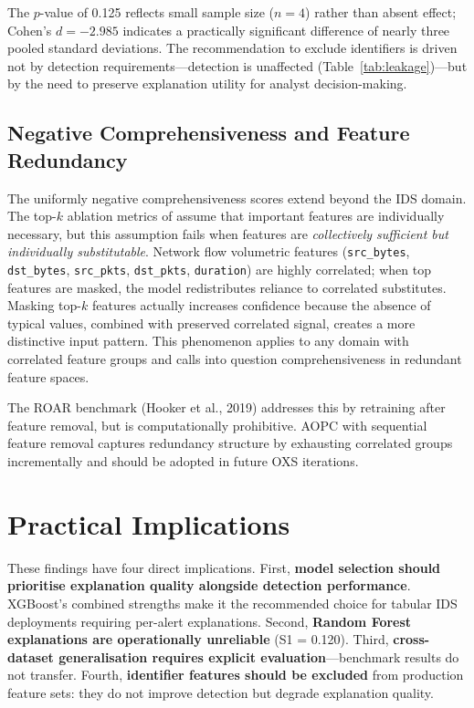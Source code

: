 \documentclass[12pt,a4paper]{report}
\begin{document}
The $p$-value of 0.125 reflects small sample size ($n = 4$) rather than absent effect; Cohen's $d = -2.985$ indicates a practically significant difference of nearly three pooled standard deviations. The recommendation to exclude identifiers is driven not by detection requirements---detection is unaffected (Table~\ref{tab:leakage})---but by the need to preserve explanation utility for analyst decision-making.

\subsection{Negative Comprehensiveness and Feature Redundancy}
\label{sec:neg-comp}

The uniformly negative comprehensiveness scores extend beyond the IDS domain. The top-$k$ ablation metrics of \cite{deyoung2020} assume that important features are individually necessary, but this assumption fails when features are \textit{collectively sufficient but individually substitutable}. Network flow volumetric features (\texttt{src\_bytes}, \texttt{dst\_bytes}, \texttt{src\_pkts}, \texttt{dst\_pkts}, \texttt{duration}) are highly correlated; when top features are masked, the model redistributes reliance to correlated substitutes. Masking top-$k$ features actually increases confidence because the absence of typical values, combined with preserved correlated signal, creates a more distinctive input pattern. This phenomenon applies to any domain with correlated feature groups and calls into question comprehensiveness in redundant feature spaces.

The ROAR benchmark (Hooker et al., 2019) addresses this by retraining after feature removal, but is computationally prohibitive. AOPC with sequential feature removal \cite{samek2017} captures redundancy structure by exhausting correlated groups incrementally and should be adopted in future OXS iterations.

\section{Practical Implications}
\label{sec:practical}

These findings have four direct implications. First, \textbf{model selection should prioritise explanation quality alongside detection performance}. XGBoost's combined strengths make it the recommended choice for tabular IDS deployments requiring per-alert explanations. Second, \textbf{Random Forest explanations are operationally unreliable} (S1 = 0.120). Third, \textbf{cross-dataset generalisation requires explicit evaluation}---benchmark results do not transfer. Fourth, \textbf{identifier features should be excluded} from production feature sets: they do not improve detection but degrade explanation quality.
\end{document}
